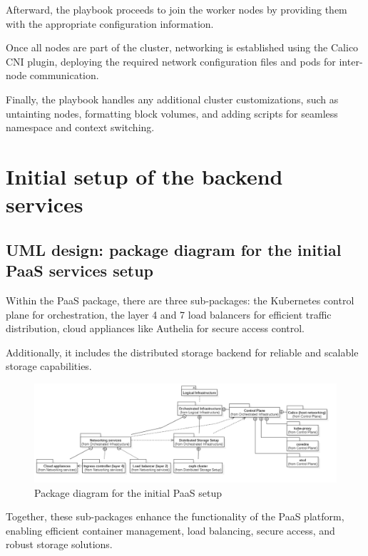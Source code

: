 \hspace{7mm}Afterward, the playbook proceeds to join the worker nodes by providing them with the appropriate configuration information. 

\hspace{7mm}Once all nodes are part of the cluster, networking is established using the Calico CNI plugin, deploying the required network configuration files and pods for inter-node communication. 

\hspace{7mm}Finally, the playbook handles any additional cluster customizations, such as untainting nodes, formatting block volumes, and adding scripts for seamless namespace and context switching.
\newpage
\section{Initial setup of the backend services }
\subsection{UML design: package diagram for the initial PaaS services setup}

\hspace{7mm}Within the PaaS package, there are three sub-packages: the Kubernetes control plane for orchestration, the layer 4 and 7 load balancers for efficient traffic distribution, cloud appliances like Authelia for secure access control.

Additionally, it includes the distributed storage backend for reliable and scalable storage capabilities.

\begin{figure}[H]\centering
\includegraphics[width=1.0\textwidth,angle=00]{assets/f21.png}
\caption{ Package diagram for the initial PaaS setup }
\label{fig:package diagram for the initial PaaS setup}
\end{figure}

\hspace{7mm}Together, these sub-packages enhance the functionality of the PaaS platform, enabling efficient container management, load balancing, secure access, and robust storage solutions.

